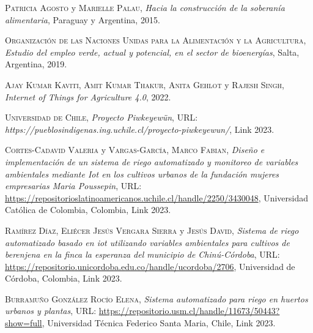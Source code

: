 \begin{thebibliography}{X}

 \textsc{Patricia Agosto} y \textsc{Marielle Palau},
\textit{Hacia la construcción de la soberanía alimentaria}, Paraguay y Argentina, 2015.

 \textsc{Organización de las Naciones Unidas para la Alimentación y la Agricultura}, \textit{Estudio del empleo verde, actual y potencial, en el sector de bioenergías}, Salta, Argentina, 2019.

 \textsc{Ajay Kumar Kaviti}, \textsc{Amit Kumar Thakur}, \textsc{Anita Gehlot} y \textsc{Rajesh Singh}, \textit{Internet of Things for Agriculture 4.0}, 2022.

 \textsc{Universidad de Chile},
\textit{Proyecto Piwkeyewün}, URL: \textit{https://pueblosindigenas.ing.uchile.cl/proyecto-piwkeyewun/}, Link 2023.

 \textsc{Cortes-Cadavid Valeria} y \textsc{Vargas-García, Marco Fabian},
\textit{Diseño e implementación de un sistema de riego automatizado y monitoreo de variables ambientales mediante Iot en los cultivos urbanos de la fundación mujeres empresarias Maria Poussepin},  URL: \url{https://repositorioslatinoamericanos.uchile.cl/handle/2250/3430048}, Universidad Católica de Colombia, Colombia, Link 2023.

 \textsc{Ramírez Díaz}, \textsc{Eliécer Jesús Vergara Sierra} y \textsc{Jesús David}, \textit{Sistema de riego automatizado basado en iot utilizando variables ambientales para cultivos de berenjena en la finca la esperanza del municipio de Chinú-Córdoba},  URL: \url{https://repositorio.unicordoba.edu.co/handle/ucordoba/2706}, Universidad de Córdoba, Colombia, Link 2023.

 \textsc{Burramuño González Rocío Elena},
\textit{Sistema automatizado para riego en huertos urbanos y plantas},  URL: \url{https://repositorio.usm.cl/handle/11673/50443?show=full}, Universidad Técnica Federico Santa Maria, Chile, Link 2023.

\end{thebibliography}